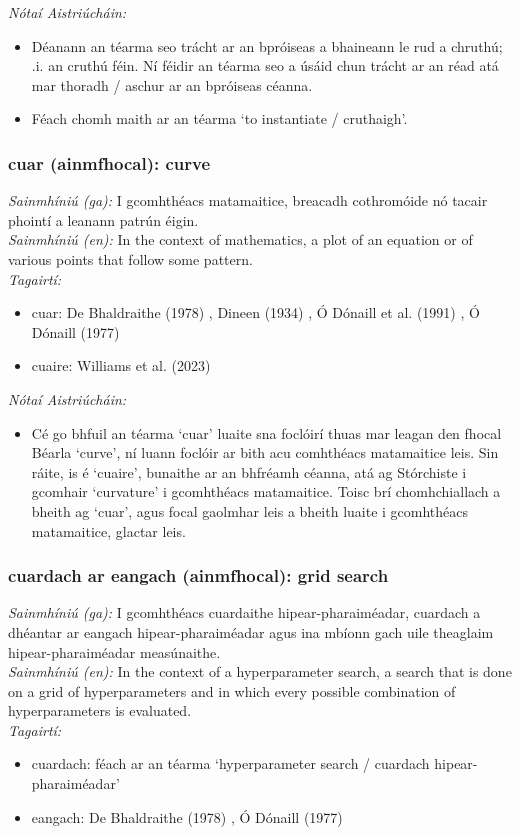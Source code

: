  \noindent \textit{Nótaí Aistriúcháin:}
\begin{itemize}
	\item Déanann an téarma seo trácht ar an bpróiseas a bhaineann le rud a chruthú; .i. an cruthú féin. Ní féidir an téarma seo a úsáid chun trácht ar an réad atá mar thoradh / aschur ar an bpróiseas céanna.
	\item Féach chomh maith ar an téarma `to instantiate / cruthaigh'.
\end{itemize}


\subsubsection*{cuar (ainmfhocal): curve}
 \noindent \textit{Sainmhíniú (ga):} I gcomhthéacs matamaitice, breacadh cothromóide nó tacair phointí a leanann patrún éigin.
\\
 \noindent \textit{Sainmhíniú (en):} In the context of mathematics, a plot of an equation or of various points that follow some pattern.
\\
 \noindent \textit{Tagairtí:}
\begin{itemize}
	\item cuar: De Bhaldraithe (1978) \cite{de-bhaldraithe}, Dineen (1934) \cite{dineen}, Ó Dónaill et al. (1991) \cite{focloir-beag}, Ó Dónaill (1977) \cite{odonaill}
	\item cuaire: Williams et al. (2023) \cite{storchiste}
\end{itemize}

 \noindent \textit{Nótaí Aistriúcháin:}
\begin{itemize}
	\item Cé go bhfuil an téarma `cuar' luaite sna foclóirí thuas mar leagan den fhocal Béarla `curve', ní luann foclóir ar bith acu comhthéacs matamaitice leis. Sin ráite, is é `cuaire', bunaithe ar an bhfréamh céanna, atá ag Stórchiste i gcomhair `curvature' i gcomhthéacs matamaitice. Toisc brí chomhchiallach a bheith ag `cuar', agus focal gaolmhar leis a bheith luaite i gcomhthéacs matamaitice, glactar leis.
\end{itemize}


\subsubsection*{cuardach ar eangach (ainmfhocal): grid search}
 \noindent \textit{Sainmhíniú (ga):} I gcomhthéacs cuardaithe hipear-pharaiméadar, cuardach a dhéantar ar eangach hipear-pharaiméadar agus ina mbíonn gach uile theaglaim hipear-pharaiméadar measúnaithe.
\\
 \noindent \textit{Sainmhíniú (en):} In the context of a hyperparameter search, a search that is done on a grid of hyperparameters and in which every possible combination of hyperparameters is evaluated.
\\
 \noindent \textit{Tagairtí:}
\begin{itemize}
	\item cuardach: féach ar an téarma `hyperparameter search / cuardach hipear-pharaiméadar'
	\item eangach: De Bhaldraithe (1978) \cite{de-bhaldraithe}, Ó Dónaill (1977) \cite{odonaill}
\end{itemize}

